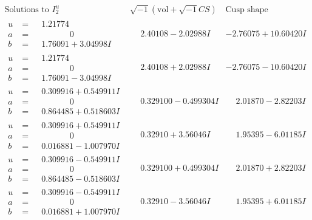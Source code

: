 \documentclass[1p]{elsarticle_modified}
\theoremstyle{definition}
\newcommand{\I}{\sqrt{-1}}
\begin{document}
$$\begin{array}{c|c|c}  
\text{Solutions to }I^u_{2}& \I (\text{vol} + \sqrt{-1}CS) & \text{Cusp shape}\\
 \hline 
\begin{aligned}
u &= \phantom{-}1.21774\phantom{ +0.000000I} \\
a &= \phantom{-0.000000 } 0 \\
b &= \phantom{-}1.76091 + 3.04998 I\end{aligned}
 & \phantom{-}2.40108 - 2.02988 I & -2.76075 + 10.60420 I \\ \hline\begin{aligned}
u &= \phantom{-}1.21774\phantom{ +0.000000I} \\
a &= \phantom{-0.000000 } 0 \\
b &= \phantom{-}1.76091 - 3.04998 I\end{aligned}
 & \phantom{-}2.40108 + 2.02988 I & -2.76075 - 10.60420 I \\ \hline\begin{aligned}
u &= \phantom{-}0.309916 + 0.549911 I \\
a &= \phantom{-0.000000 } 0 \\
b &= \phantom{-}0.864485 + 0.518603 I\end{aligned}
 & \phantom{-}0.329100 - 0.499304 I & \phantom{-}2.01870 - 2.82203 I \\ \hline\begin{aligned}
u &= \phantom{-}0.309916 + 0.549911 I \\
a &= \phantom{-0.000000 } 0 \\
b &= \phantom{-}0.016881 - 1.007970 I\end{aligned}
 & \phantom{-}0.32910 + 3.56046 I & \phantom{-}1.95395 - 6.01185 I \\ \hline\begin{aligned}
u &= \phantom{-}0.309916 - 0.549911 I \\
a &= \phantom{-0.000000 } 0 \\
b &= \phantom{-}0.864485 - 0.518603 I\end{aligned}
 & \phantom{-}0.329100 + 0.499304 I & \phantom{-}2.01870 + 2.82203 I \\ \hline\begin{aligned}
u &= \phantom{-}0.309916 - 0.549911 I \\
a &= \phantom{-0.000000 } 0 \\
b &= \phantom{-}0.016881 + 1.007970 I\end{aligned}
 & \phantom{-}0.32910 - 3.56046 I & \phantom{-}1.95395 + 6.01185 I \\ \hline\begin{aligned}

\end{aligned}
\end{array}$$
\end{document}
